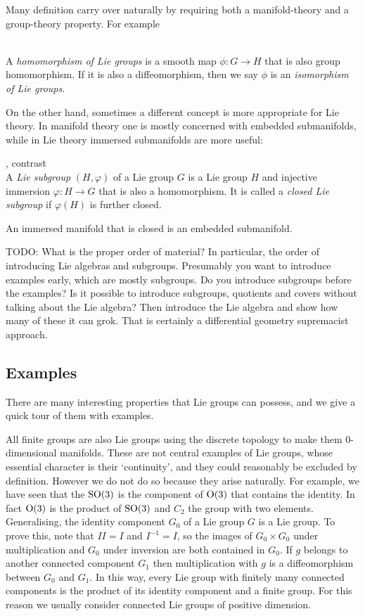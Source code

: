 Many definition carry over naturally by requiring both a manifold-theory and a group-theory property.
For example
\begin{definition}
\textup{\cite[3.13]{Warner1983}} \\
A \emph{homomorphism of Lie groups} is a smooth map $\phi : G \to H$ that is also group homomorphism.
If it is also a diffeomorphism, then we say $\phi$ is an \emph{isomorphism of Lie groups}.
\end{definition}
On the other hand, sometimes a different concept is more appropriate for Lie theory.
In manifold theory one is mostly concerned with embedded submanifolds, while in Lie theory immersed submanifolds are more useful:
\begin{definition}
\textup{\cite[3.17]{Warner1983}, contrast~\cite[\S{}7.1]{Fulton2004}}\\
A \emph{Lie subgroup} $(H,\varphi)$ of a Lie group $G$ is a Lie group $H$ and injective immersion $\varphi : H \to G$ that is also a homomorphism.
It is called a \emph{closed Lie subgroup} if $\varphi(H)$ is further closed.
\end{definition}
An immersed manifold that is closed is an embedded submanifold. 

TODO: What is the proper order of material? 
In particular, the order of introducing Lie algebras and subgroups. 
Presumably you want to introduce examples early, which are mostly subgroups. 
Do you introduce subgroups before the examples?
Is it possible to introduce subgroups, quotients and covers without talking about the Lie algebra? Then introduce the Lie algebra and show how many of these it can grok.
That is certainly a differential geometry supremacist approach.


\subsection{Examples}

There are many interesting properties that Lie groups can possess, and we give a quick tour of them with examples.

All finite groups are also Lie groups using the discrete topology to make them $0$-dimensional manifolds.
These are not central examples of Lie groups, whose essential character is their `continuity', and they could reasonably be excluded by definition.
However we do not do so because they arise naturally.
For example, we have seen that the $\mathrm{SO}(3)$ is the component of $\mathrm{O}(3)$ that contains the identity.
In fact $\mathrm{O}(3)$ is the product of $\mathrm{SO}(3)$ and $C_2$ the group with two elements.
Generalising, the identity component $G_0$ of a Lie group $G$ is a Lie group.
To prove this, note that $II = I$ and $I^{-1} = I$, so the images of $G_0\times G_0$ under multiplication and $G_0$ under inversion are both contained in $G_0$.
If $g$ belongs to another connected component $G_1$ then multiplication with $g$ is a diffeomorphism between $G_0$ and $G_1$.
In this way, every Lie group with finitely many connected components is the product of its identity component and a finite group.
For this reason we usually consider connected Lie groups of positive dimension.

